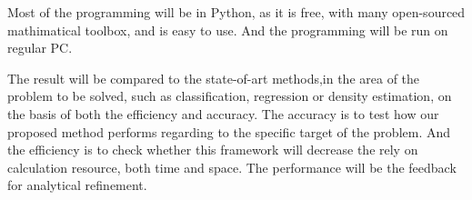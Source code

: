 \begin{enumerate}
 Most of the programming will be in Python, as it is free, with many open-sourced mathimatical toolbox, and is easy to use. And the programming will be run on regular PC. 
 
 
 The result will be compared to the state-of-art methods,in the area of the problem to be solved, such as classification, regression or density estimation, on the basis of both the efficiency and accuracy. The accuracy is to test how our proposed method performs regarding to the specific target of the problem. And the efficiency is to check whether this framework will decrease the rely on calculation resource, both time and space. The performance will be the feedback for analytical refinement.
\end{enumerate}